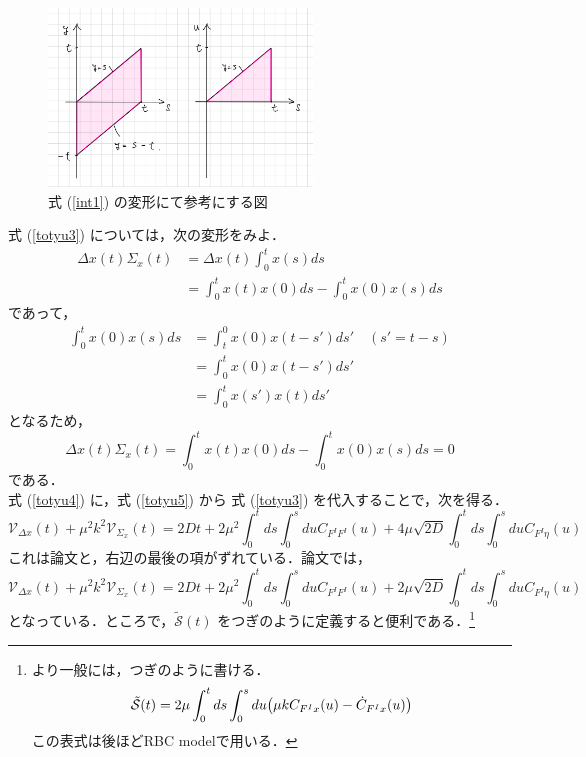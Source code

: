 \documentclass{jsarticle}
\numberwithin{equation}{section}
\theoremstyle{definition}
\begin{document}
\begin{figure}[H]
  \begin{center}  
  \includegraphics[width=7cm]{int_inv.jpg}  
  \end{center}
  \caption{式 (\ref{int1}) の変形にて参考にする図}
\end{figure}

式 (\ref{totyu3}) については，次の変形をみよ．
\begin{align}
  \Delta x(t) \Sigma_x (t) &=   \Delta x(t) \int_0^t x(s) ds \\
  &= \int_0^t x(t)x(0) ds - \int_0^t x(0) x(s) ds 
\end{align}
であって，
\begin{align}
  \int_0^t x(0) x(s) ds &= \int_t^0 x(0)x(t-s') ds' \quad (s' = t-s) \\
  &= \int_0^t x(0) x(t-s') ds' \\
  &= \int_0^t x(s') x(t) ds'
\end{align}
となるため，
\begin{equation}
  \Delta x(t) \Sigma_x (t) = \int_0^t x(t)x(0) ds - \int_0^t x(0) x(s) ds = 0
\end{equation}
である．\\
\quad 式 (\ref{totyu4}) に，式 (\ref{totyu5}) から 式 (\ref{totyu3}) を代入することで，次を得る．
\begin{equation}
  \mathcal{V} _{\Delta x} (t) + \mu^2 k^2 \mathcal{V} _{\Sigma_x} (t) = 2Dt + 2\mu^2 \int_0^t ds \int_0^s du C_{F^I F^I} (u) + 4\mu \sqrt{2D} \int_0^t ds \int_0^s du C_{F^I \eta } (u)
\end{equation}
これは論文と，右辺の最後の項がずれている．論文では，
\begin{equation}
  \mathcal{V} _{\Delta x} (t) + \mu^2 k^2 \mathcal{V} _{\Sigma_x} (t) = 2Dt + 2\mu^2 \int_0^t ds \int_0^s du C_{F^I F^I} (u) + 2\mu \sqrt{2D} \int_0^t ds \int_0^s du C_{F^I \eta } (u)   
\end{equation}
となっている．ところで，$\tilde{\mathcal{S}}(t)$ をつぎのように定義すると便利である．\footnote{より一般には，つぎのように書ける．
\begin{equation}
  \tilde{\mathcal{S}}(t) = 2 \mu \int_0^t ds \int_0^s du \qty( \mu k C_{F^I x}(u) - \dot{C}_{F^I x} (u) )
\end{equation}
この表式は後ほどRBC modelで用いる．
}
\end{document}

